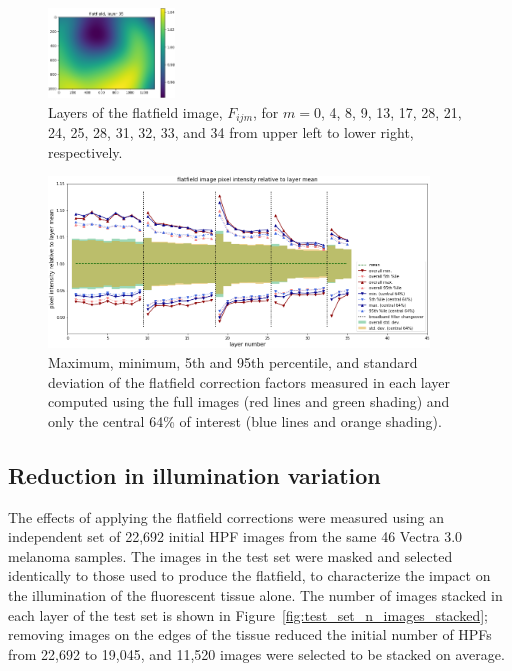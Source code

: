 \documentclass[letterpaper,11pt]{article}
\newcommand{\reffig}[1]{Figure~\ref{#1}}
\begin{document}
\begin{figure}[!ht]
\includegraphics[width=0.3\textwidth]{images/results/flatfield_layers/flatfield_layer_35}
\caption{\footnotesize Layers of the flatfield image, $F_{ijm}$, for $m=$0, 4, 8, 9, 13, 17, 28, 21, 24, 25, 28, 31, 32, 33, and 34 from upper left to lower right, respectively.}
\label{fig:flatfield_image_layers}
\end{figure}

\begin{figure}[!ht]
\centering
\includegraphics[width=0.90\textwidth]{images/results/flatfield_pixel_intensities}
\caption{\footnotesize Maximum, minimum, 5th and 95th percentile, and standard deviation of the flatfield correction factors measured in each layer computed using the full images (red lines and green shading) and only the central 64\% of interest (blue lines and orange shading).}
\label{fig:flatfield_pixel_intensities}
\end{figure} 

\subsection{Reduction in illumination variation}
\label{ssec:reduction_in_illumination_variation}

The effects of applying the flatfield corrections were measured using an independent set of 22,692 initial HPF images from the same 46 Vectra 3.0 melanoma samples. The images in the test set were masked and selected identically to those used to produce the flatfield, to characterize the impact on the illumination of the fluorescent tissue alone. The number of images stacked in each layer of the test set is shown in \reffig{fig:test_set_n_images_stacked}; removing images on the edges of the tissue reduced the initial number of HPFs from 22,692 to 19,045, and 11,520 images were selected to be stacked on average.
\end{document}

